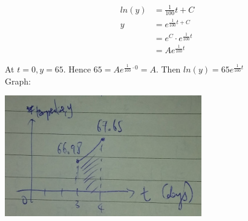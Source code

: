 \documentclass[9pt]{article}
\begin{document}
\begin{align*}
  ln(y) &= \frac{1}{100}t + C \\
  y &= e^{\frac{1}{100}t + C} \\
  &= e^{C} \cdot e^{\frac{1}{100}t} \\
  &= Ae^{\frac{1}{100}t}
\end{align*}

At $t = 0, y = 65$. Hence $65 = Ae^{\frac{1}{100} \cdot 0} = A$. Then $ln(y) = 65e^{\frac{1}{100}t}$ \\

Graph:

\begin{center}
  \includegraphics{q1a.jpg}
\end{center}
\end{document}
